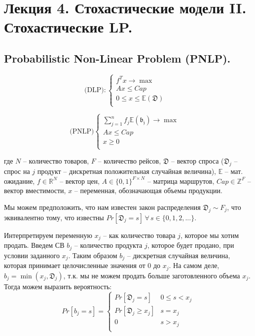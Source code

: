 \documentclass[reqno]{article}
\theoremstyle{definition}
\theoremstyle{definition}
\theoremstyle{definition}
\theoremstyle{definition}
\theoremstyle{definition}
\theoremstyle{definition}
\theoremstyle{definition}
\theoremstyle{definition}
\theoremstyle{definition}
\begin{document}
	
	\newpage
	\section{Лекция 4. Стохастические модели II. Стохастические LP.}
			
		\subsection{Probabilistic Non-Linear Problem (PNLP).}
		
		\begin{multicols}{2}
			$$
			\text{(DLP)}:
			\begin{cases}
				f^Tx \rightarrow \max & \\
				Ax \leq Cap & \\
				0 \leq x \leq \mathds{E}(\mathfrak{D}) & \\
			\end{cases}	
			$$
			
			\columnbreak
			
			$$
			\text{(PNLP)}
			\begin{cases}
				\sum\limits_{j=1}^n f_j \mathds{E}(\mathfrak{b_j}) \rightarrow \max & \\
				Ax \leq Cap & \\
				x \geq 0 & \\
			\end{cases}
			$$
		\end{multicols}
		
		где $N$ -- количество товаров, $F$ -- количество рейсов, $\mathfrak{D}$ -- вектор спроса ($\mathfrak{D}_j$ -- спрос на $j$ продукт -- дискретная положительная случайная величина), $\mathds{E}$ -- мат. ожидание, $f \in \mathds{R}^N$ -- вектор цен, $A \in \{0, 1\}^{F \times N}$ -- матрица маршрутов, $Cap \in \mathds{Z}^F$ -- вектор вместимости, $x$ -- переменная, обозначающая объемы продукции.
		
		Мы можем предположить, что нам известен закон распределения $\mathfrak{D}_j \sim F_j$, что эквивалентно тому, что известны $Pr[\mathfrak{D}_j = s]\,\forall\,s \in \{0, 1, 2, ...\}$.
		
		Интерпретируем переменную $x_j$ -- как количество товара $j$, которое мы хотим продать. Введем СВ $b_j$ -- количество продукта $j$, которое будет продано, при условии заданного $x_j$. Таким образом $b_j$ -- дискретная случайная величина, которая принимает целочисленные значения от $0$ до $x_j$. На самом деле, $b_j = \min(x_j, \mathfrak{D}_j)$, т.к. мы не можем продать больше заготовленного объема $x_j$. Тогда можем выразить вероятность:
		$$
		Pr[b_j = s] = 
		\begin{cases}
			Pr[\mathfrak{D}_j = s] & 0 \leq s < x_j \\
			Pr[\mathfrak{D}_j \geq x_j] & s = x_j \\
			0 & s > x_j \\
		\end{cases}
		$$
		
\end{document}
